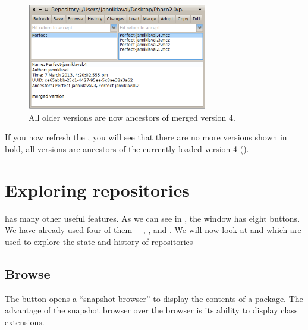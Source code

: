 \documentclass[a4paper,10pt,twoside]{book}
\begin{document}

\begin{figure}[ht]\centering
	\includegraphics[width=0.7\textwidth]{merged}
	\caption{All older versions are now ancestors of merged version 4.
	}
\end{figure}

If you now refresh the \RI, you will see that there are no more versions shown in bold, \ie all versions are ancestors of the currently loaded version 4 ().

\section{Exploring \Mont repositories}

\Mont has many other useful features. As we can see in , the \MCB window has eight buttons. We have already used four of them\,---\,, ,  and .
We will now look at  and  which are used to explore the state and history of repositories

\subsection{Browse}

The  button opens a ``snapshot browser'' to display the contents of a package.
The advantage of the snapshot browser over the browser is its ability to display class extensions.

\end{document}
